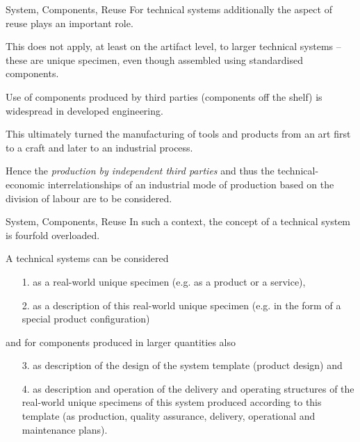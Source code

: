 \documentclass{beamer}
\begin{document}
\begin{frame}{System, Components, Reuse}
  For technical systems additionally the aspect of reuse plays an important
  role.
  
This does not apply, at least on the artifact level, to larger technical
systems – these are unique specimen, even though assembled using standardised
components.

Use of components produced by third parties (components off the shelf) is
widespread in developed engineering.

This ultimately turned the manufacturing of tools and products from an art first
to a craft and later to an industrial process.

\begin{block}{}
  Hence the \emph{production by independent third parties} and thus the
  technical-economic interrelationships of an industrial mode of production
  based on the division of labour are to be considered.
\end{block}

\end{frame}

\begin{frame}{System, Components, Reuse}
  In such a context, the concept of a technical system is fourfold overloaded.

  \begin{block}{A technical systems can be considered}
    \begin{itemize}
    \item [1.] as a real-world unique specimen (e.g. as a product or a service),
    \item [2.] as a description of this real-world unique specimen (e.g. in the
      form of a special product configuration)
    \end{itemize}
  \end{block}

  \begin{block}{and for components produced in larger quantities also}
    \begin{itemize}
    \item [3.] as description of the design of the system template (product
      design) and
    \item [4.] as description and operation of the delivery and operating
      structures of the real-world unique specimens of this system produced
      according to this template (as production, quality assurance, delivery,
      operational and maintenance plans).
    \end{itemize}
  \end{block}
\end{frame}
\end{document}
